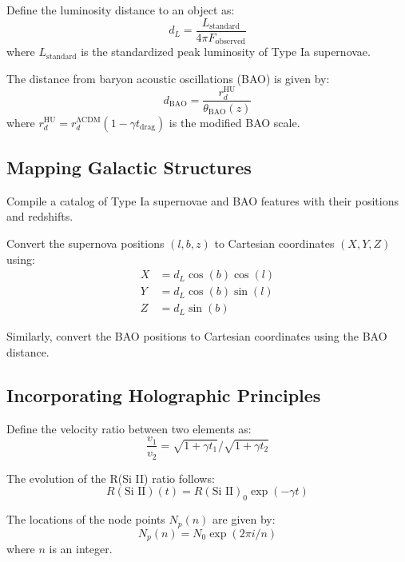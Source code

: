 \documentclass{article}
\begin{document}
Define the luminosity distance to an object as:
\begin{equation}
d_L = \frac{L_\text{standard}}{4\pi F_\text{observed}}
\end{equation}
where $L_\text{standard}$ is the standardized peak luminosity of Type Ia supernovae.

The distance from baryon acoustic oscillations (BAO) is given by:
\begin{equation}
d_\text{BAO} = \frac{r_d^\text{HU}}{
\theta_\text{BAO}(z)}
\end{equation}
where $r_d^\text{HU} = r_d^\text{ΛCDM} \left(1 - \gamma t_\text{drag}\right)$ is the modified BAO scale.

\subsection*{Mapping Galactic Structures}

Compile a catalog of Type Ia supernovae and BAO features with their positions and redshifts.

Convert the supernova positions $(l, b, z)$ to Cartesian coordinates $(X, Y, Z)$ using:
\begin{align}
X &= d_L \cos(b) \cos(l) \\
Y &= d_L \cos(b) \sin(l) \\
Z &= d_L \sin(b)
\end{align}

Similarly, convert the BAO positions to Cartesian coordinates using the BAO distance.

\subsection*{Incorporating Holographic Principles}

Define the velocity ratio between two elements as:
\begin{equation}
\frac{v_1}{v_2} = \sqrt{1 + \gamma t_1} / \sqrt{1 + \gamma t_2}
\end{equation}

The evolution of the R(Si II) ratio follows:
\begin{equation}
R(\text{Si II})(t) = R(\text{Si II})_0 \exp(-\gamma t)
\end{equation}

The locations of the node points $N_p(n)$ are given by:
\begin{equation}
N_p(n) = N_0 \exp(2\pi i /n)
\end{equation}
where $n$ is an integer.
\end{document}
